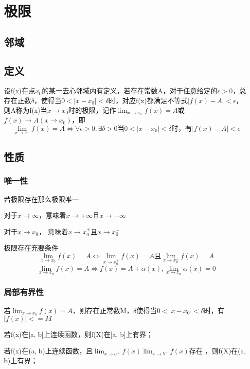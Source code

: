 
\chapter{极限}

\section{邻域}

\section{定义}

设f(x)在点\(x_0\)的某一去心邻域内有定义，若存在常数A，对于任意给定的\(\epsilon > 0\)，总存在正数\(\delta\)，使得当\(0 < |x - x_0| < \delta\)时，对应f(x)都满足不等式\(|f(x) - A| < \epsilon\)，则A称为f(x)当\(x \to x_0\)时的极限，记作\(\lim_{x \to x_0}f(x) = A\)或\(f(x) \to A(x \to x_0)\)，即
\[\lim_{x \to x_0}f(x) = A \Leftrightarrow \forall \epsilon > 0, \exists \delta > 0\text{当}0 < |x - x_0| < \delta\text{时，有}|f(x) - A| < \epsilon\]


\section{性质}

\subsection{唯一性}
若极限存在那么极限唯一

对于\(x \to \infty\)，意味着\(x \to +\infty\)且\(x \to -\infty\)

对于\(x \to x_0\)， 意味着\(x \to x_0^+\)且\(x \to x_0^-\)

极限存在充要条件
\[\lim_{x \to x_0}f(x) = A \Leftrightarrow \lim_{x \to x_0^+}f(x) = A \text{且} \lim_{x \to x_0^-}f(x) = A\]
\[\lim_{x \to x_0}f(x) = A \Leftrightarrow f(x) = A + \alpha(x), \lim_{x \to x_0}\alpha(x) = 0\]


\subsection{局部有界性}
若\(\lim_{x \to x_0}f(x) = A\)，则存在正常数M，\(\delta\)使得当\(0 < |x - x_0| < \delta\)时，有\(|f(x)| <= M\)

若f(x)在[a, b]上连续函数，则f(X)在[a, b]上有界；

若f(x)在(a, b)上连续函数，且\(\displaystyle \lim_{x \to a^+}f(x)\lim_{x \to b^-}f(x)\)存在 ，则f(X)在(a, b)上有界；

